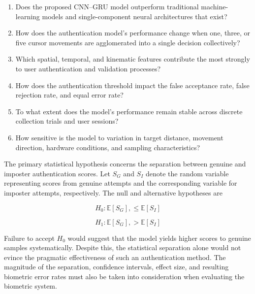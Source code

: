 \documentclass[conference]{IEEEtran}
\begin{document}
\begin{enumerate}
    \item Does the proposed CNN--GRU model outperform traditional machine-learning models and single-component neural architectures that exist?

    \item How does the authentication model's performance change when one, three, or five cursor movements are agglomerated into a single decision collectively?

    \item Which spatial, temporal, and kinematic features contribute the most strongly to user authentication and validation processes?

    \item How does the authentication threshold impact the false acceptance rate, false rejection rate, and equal error rate?

    \item To what extent does the model's performance remain stable across discrete collection trials and user sessions?

    \item How sensitive is the model to variation in target distance, movement direction, hardware conditions, and sampling characteristics?
\end{enumerate}

The primary statistical hypothesis concerns the separation between genuine and imposter authentication scores. Let $S_G$ and $S_I$ denote the random variable representing scores from genuine attempts and the corresponding variable for imposter attempts, respectively. The null and alternative hypotheses are 

\begin{equation}
H_0:
\mathbb{E}[S_G],
\leq
\mathbb{E}[S_I]
\label{eq:null_hypothesis}
\end{equation}

\begin{equation}
H_1:
\mathbb{E}[S_G],
>
\mathbb{E}[S_I]
\label{eq:alternative_hypothesis}
\end{equation}

Failure to accept $H_0$ would suggest that the model yields higher scores to genuine samples systematically. Despite this, the statistical separation alone would not evince the pragmatic effectiveness of such an authentication method. The magnitude of the separation, confidence intervals, effect size, and resulting biometric error rates must also be taken into consideration when evaluating the biometric system. 
\end{document}
